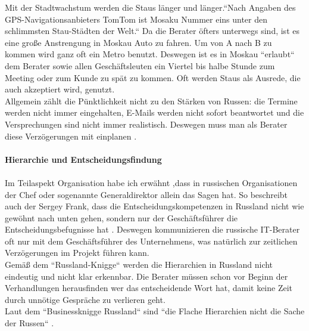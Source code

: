 	 Mit der Stadtwachstum werden die Staus länger und länger.``Nach Angaben des GPS-Navigationsanbieters TomTom ist Mosaku Nummer eins unter den schlimmsten Stau-Städten der Welt\cite{MoskauStau1}.``
	 Da die Berater öfters unterwegs sind, ist es eine große Anstrengung in Moskau Auto zu fahren. Um von A nach B zu kommen wird ganz oft ein Metro benutzt. 
	 Deswegen ist es in Moskau ``erlaubt`` dem Berater sowie allen Geschäftsleuten ein Viertel bis halbe Stunde zum Meeting oder zum  Kunde zu spät zu kommen. Oft werden Staus als Ausrede, die auch akzeptiert wird, genutzt.\\
	 Allgemein zählt die Pünktlichkeit nicht zu den Stärken von Russen: die Termine werden nicht immer eingehalten, E-Mails werden nicht sofort beantwortet und die Versprechungen sind nicht immer realistisch. Deswegen muss man als Berater diese Verzögerungen mit einplanen \cite{RusKnigge}.\\ \\
	 	 \textbf{Hierarchie und Entscheidungsfindung}\\
	 	 \\
	 Im Teilaspekt Organisation habe ich erwähnt ,dass in russischen Organisationen der Chef oder sogenannte Generaldirektor  allein das Sagen hat. So beschreibt auch der Sergey Frank, dass die Entscheidungskompetenzen in Russland nicht wie gewöhnt nach unten gehen, sondern nur der Geschäftsführer die Entscheidungsbefugnisse hat \cite{RuSFI}.
	 Deswegen kommunizieren die russische IT-Berater oft nur mit dem Geschäftsführer des Unternehmens, was natürlich zur zeitlichen Verzögerungen im Projekt führen kann.\\
	 Gemäß dem ``Russland-Knigge`` \cite{RusKnigge} werden die Hierarchien in Russland nicht eindeutig und nicht klar erkennbar. Die Berater müssen schon vor Beginn der Verhandlungen herausfinden wer das entscheidende Wort hat, damit keine Zeit durch unnötige Gespräche zu verlieren geht.\\
	 Laut dem ``Businessknigge Russland`` sind ``die Flache Hierarchien nicht die Sache der Russen`` \cite{RusKnigge}. 
	
